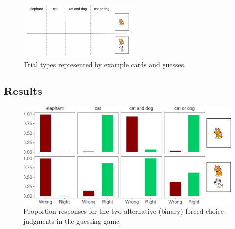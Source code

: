 \documentclass[floatsintext,man]{apa6}
\theoremstyle{definition}
\theoremstyle{definition}
\theoremstyle{definition}
\theoremstyle{remark}
\begin{document}
\begin{figure}[t]

{\centering \includegraphics{writeup_files/figure-latex/trials-1} 

}

\caption{Trial types represented by example cards and guesses.}\label{fig:trials}
\end{figure}

\subsection{Results}\label{results}

\begin{figure}[t]

{\centering \includegraphics{writeup_files/figure-latex/binaryPlot-1} 

}

\caption{Proportion responses for the two-alternative (binary) forced choice judgments in the guessing game.}\label{fig:binaryPlot}
\end{figure}
\end{document}
